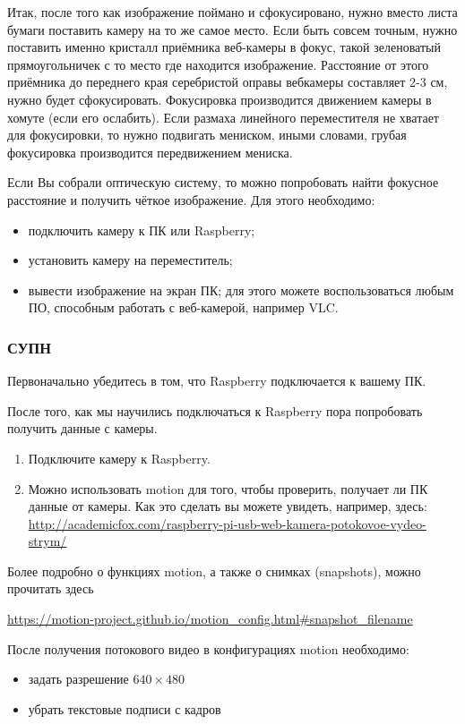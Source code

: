 Итак, после того как изображение поймано и сфокусировано, нужно вместо листа бумаги поставить камеру на то же самое место. Если быть совсем точным, нужно поставить именно кристалл приёмника веб-камеры в фокус, такой зеленоватый прямоугольничек с то место где находится изображение. Расстояние от этого приёмника до переднего края серебристой оправы вебкамеры составляет 2-3 см, нужно будет сфокусировать. Фокусировка производится движением камеры в хомуте (если его ослабить). Если размаха линейного переместителя не хватает для фокусировки, то нужно подвигать мениском, иными словами, грубая фокусировка производится передвижением мениска.

Если Вы собрали оптическую систему, то можно попробовать найти фокусное расстояние и получить чёткое изображение. Для этого необходимо:
\begin{itemize}
    \item подключить камеру к ПК или Raspberry;
    \item установить камеру на переместитель;
    \item вывести изображение на экран ПК; для этого можете воспользоваться любым ПО, способным работать с веб-камерой, например VLC.
\end{itemize}

\subsubsection*{СУПН}

Первоначально убедитесь в том, что Raspberry подключается к вашему ПК. 

После того, как мы научились подключаться к Raspberry пора попробовать получить данные с камеры. 
\begin{enumerate}
    \item Подключите камеру к Raspberry.
    \item Можно использовать motion для того, чтобы проверить, получает ли ПК данные от камеры. Как это сделать вы можете увидеть, например, здесь: \url{http://academicfox.com/raspberry-pi-usb-web-kamera-potokovoe-vydeo-strym/}
\end{enumerate}

Более подробно о функциях motion, а также о снимках (snapshots), можно прочитать здесь 

\url{https://motion-project.github.io/motion_config.html#snapshot_filename}

После получения потокового видео в конфигурациях motion необходимо:
\begin{itemize}
    \item задать разрешение $640 \times 480$
    \item убрать текстовые подписи с кадров
\end{itemize}

